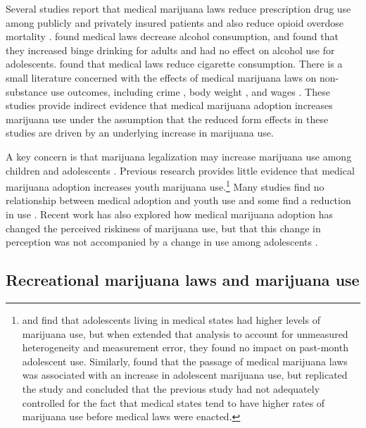 \documentclass[12pt]{article}%
\begin{document}
Several studies report that medical marijuana laws reduce prescription drug use among publicly and privately insured patients and also reduce opioid overdose mortality \citep{Bachhuber2014,Bradford2018, Ozluk2017,Powell2018}.
\citet{Anderson2013} found medical laws decrease alcohol consumption, and \citet{WEN201564} found that they increased binge drinking for adults and had no effect on alcohol use for adolescents.
\citet{Choi2019} found that medical laws reduce cigarette consumption.
There is a small literature concerned with the effects of medical marijuana laws on non-substance use outcomes, including crime \citep{Morris2014,Gavrilova2017}, body weight \citep{Sabia2017}, and wages \citep{Sabia2018}. 
These studies provide indirect evidence that medical marijuana adoption increases marijuana use under the assumption that the reduced form effects in these studies are driven by an underlying increase in marijuana use. 

A key concern is that marijuana legalization may increase marijuana use among children and adolescents \citep{Anderson2014,Hall2015a,Hall2016,NationalAcademiesofSciencesEngineering2017,Salomonsen-Sautel2012,Thurstone2011,Volkow2014}. 
Previous research provides little evidence that medical marijuana adoption increases youth marijuana use.\footnote{\cite{Hasin2015} and \cite{Wall2011} find that adolescents living in  medical states had higher levels of marijuana use, but when \cite{Harper2012} extended that analysis to account for unmeasured heterogeneity and measurement error, they found no impact on past-month adolescent use. Similarly, \cite{Stolzenberg2016} found that the passage of medical marijuana laws was associated with an increase in adolescent marijuana use, but \cite{Wall2016} replicated the study and concluded that the previous study had not adequately controlled for the fact that medical states tend to have higher rates of marijuana use before medical laws were enacted.}
Many studies find no relationship between medical adoption and youth use \citep{Anderson2019, Anderson2015, Choo2014, Harper2012, Lynne-Landsman2013, Wall2016} and some find a reduction in use \citep{Johnson2017, Keyes2016}. 
Recent work has also explored how medical marijuana adoption has changed the perceived riskiness of marijuana use, but that this change in perception was not accompanied by a change in use among adolescents  \citep{Wen2018a,Sarvet2018}.


\subsection{Recreational marijuana laws and marijuana use}\label{sec:rml_related_research}
\end{document}
